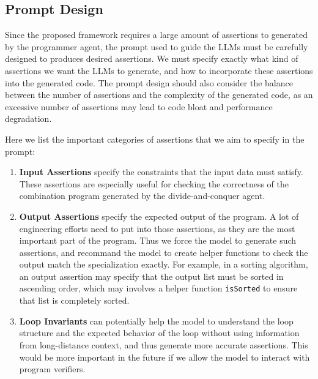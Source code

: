 
\subsection{Prompt Design}

Since the proposed framework requires a large amount of assertions to generated by the programmer agent, the prompt used to guide the LLMs must be carefully designed to produces desired assertions. We must specify exactly what kind of assertions we want the LLMs to generate, and how to incorporate these assertions into the generated code. The prompt design should also consider the balance between the number of assertions and the complexity of the generated code, as an excessive number of assertions may lead to code bloat and performance degradation.

Here we list the important categories of assertions that we aim to specify in the prompt:

\begin{enumerate}
    \item \textbf{Input Assertions} specify the constraints that the input data must satisfy. These assertions are especially useful for checking the correctness of the combination program generated by the divide-and-conquer agent.
    \item \textbf{Output Assertions} specify the expected output of the program. A lot of engineering efforts need to put into those assertions, as they are the most important part of the program. Thus we force the model to generate such assertions, and recommand the model to create helper functions to check the output match the specialization exactly. For example, in a sorting algorithm, an output assertion may specify that the output list must be sorted in ascending order, which may involves a helper function \texttt{isSorted} to ensure that list is completely sorted.
    \item \textbf{Loop Invariants} can potentially help the model to understand the loop structure and the expected behavior of the loop without using information from long-distance context, and thus generate more accurate assertions. This would be more important in the future if we allow the model to interact with program verifiers.
\end{enumerate}

